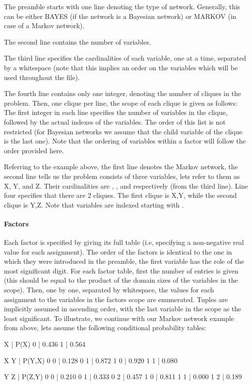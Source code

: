 The preamble starts with one line denoting the type of network. Generally, this can be either B\+A\+Y\+ES (if the network is a Bayesian network) or M\+A\+R\+K\+OV (in case of a Markov network).

The second line contains the number of variables.

The third line specifies the cardinalities of each variable, one at a time, separated by a whitespace (note that this implies an order on the variables which will be used throughout the file).

The fourth line contains only one integer, denoting the number of cliques in the problem. Then, one clique per line, the scope of each clique is given as follows\+: The first integer in each line specifies the number of variables in the clique, followed by the actual indexes of the variables. The order of this list is not restricted (for Bayesian networks we assume that the child variable of the clique is the last one). Note that the ordering of variables within a factor will follow the order provided here.

Referring to the example above, the first line denotes the Markov network, the second line tells us the problem consists of three variables, let\textquotesingle{}s refer to them as {\ttfamily X}, {\ttfamily Y}, and {\ttfamily Z}. Their cardinalities are {}, {}, and {} respectively (from the third line). Line four specifies that there are 2 cliques. The first clique is {\ttfamily X,Y}, while the second clique is {\ttfamily Y,Z}. Note that variables are indexed starting with {}.

\paragraph*{Factors}

Each factor is specified by giving its full table (i.\+e, specifying a non-\/negative real value for each assignment). The order of the factors is identical to the one in which they were introduced in the preamble, the first variable has the role of the \textquotesingle{}most significant\textquotesingle{} digit. For each factor table, first the number of entries is given (this should be equal to the product of the domain sizes of the variables in the scope). Then, one by one, separated by whitespace, the values for each assignment to the variables in the factor\textquotesingle{}s scope are enumerated. Tuples are implicitly assumed in ascending order, with the last variable in the scope as the {\ttfamily least significant}. To illustrate, we continue with our Markov network example from above, let\textquotesingle{}s assume the following conditional probability tables\+: \begin{DoxyVerb}    X | P(X)  
    0 | 0.436 
    1 | 0.564 

    X   Y |  P(Y,X)
    0   0 |  0.128
    0   1 |  0.872
    1   0 |  0.920
    1   1 |  0.080

    Y   Z |  P(Z,Y)
    0   0 |  0.210
    0   1 |  0.333
    0   2 |  0.457
    1   0 |  0.811
    1   1 |  0.000
    1   2 |  0.189
\end{DoxyVerb}


